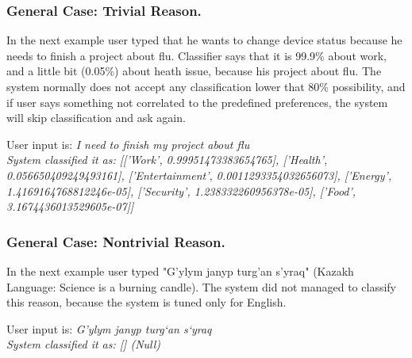 \documentclass{llncs}
\begin{document}
    \subsubsection{General Case: Trivial Reason.}
    In the next example user typed that he wants to change device status because he needs to finish a project about flu.
    Classifier says that it is 99.9\% about work, and a little bit (0.05\%) about heath issue, because his project about flu.
    The system normally does not accept any classification lower that 80\% possibility, and if user says something not
    correlated to the predefined preferences, the system will skip classification and ask again.
    \begin{example}
        User input is: \em I need to finish my project about flu \em \\
        System classified it as: \em [['Work', 0.99951473383654765], ['Health', 0.056650409249493161], ['Entertainment', 0.0011293354032656073], ['Energy', 1.4169164768812246e-05], ['Security', 1.238332260956378e-05], ['Food', 3.1674436013529605e-07]] \em
    \end{example}
    \subsubsection{General Case: Nontrivial Reason.}
    In the next example user typed "G'ylym janyp turg'an s'yraq" (Kazakh Language: Science is a burning candle).
    The system did not managed to classify this reason, because the system is tuned only for English.
    \begin{example}
        User input is: \em G'ylym janyp turg`an s`yraq \em\\
        System classified it as: \em [] (Null) \em
    \end{example}
\end{document}
